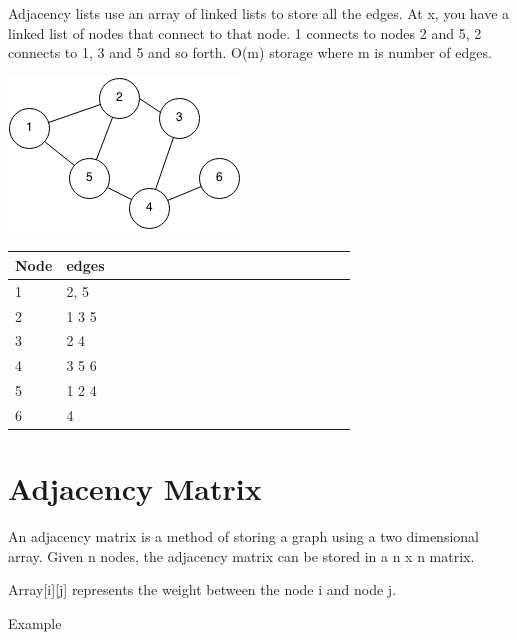 \documentclass[11pt,oneside]{book}
\makeatletter
\def\maxwidth#1{\ifdim\Gin@nat@width>#1 #1\else\Gin@nat@width\fi}
\makeatother
\begin{document}
Adjacency lists use an array of linked lists to store all the edges. At x, you have a linked list of nodes that connect to 
that node. 1 connects to nodes 2 and 5, 2 connects to 1, 3 and 5 and so forth. O(m) storage where m is number of edges.

\includegraphics[width=\maxwidth{\textwidth}]{graph.png}

\vspace{10pt} \begin{tabulary}{0.4\linewidth}{|l|l|l|l|l|l|l|l|l|l|l|l|l|l|l|l|l|l|l}\hline


  Node &
  edges\\
\hline


  1 &
  2, 5\\

  2 &
  1 3 5\\

  3 &
  2 4\\

  4 &
  3 5 6\\

  5 &
  1 2 4\\

  6 &
  4\\

\hline\end{tabulary}



        \section{ Adjacency Matrix }
        

An adjacency matrix is a method of storing a graph using a two dimensional array. Given n nodes, the adjacency matrix can be stored in a n x n matrix.

Array[i][j] represents the weight between the node i and node j.

Example
\end{document}
